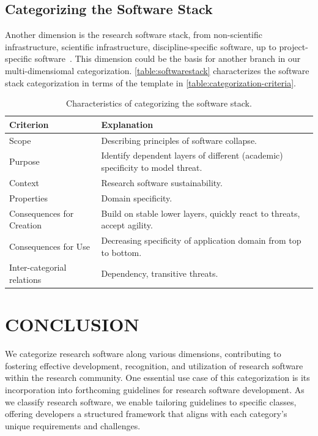 \documentclass{IEEEcsmag}
\begin{document}
\subsection{Categorizing the Software Stack}

Another dimension is the research software stack, from non-scientific infrastructure, scientific infrastructure, discipline-specific software, up to project-specific software~\cite{Hinsen2019}.
This dimension could be the basis for another branch in our multi-dimensiomal categorization.
\autoref{table:softwarestack} characterizes the software stack categorization in terms of the template in \autoref{table:categorization-criteria}.

\begin{table}[bt]
    \centering
    \begin{tabularx}{\textwidth}{l X}
    \toprule
        Criterion & Explanation \\
    \midrule
        Scope & Describing principles of software collapse. \\
        Purpose & Identify dependent layers of different (academic) specificity to model threat.\\
        Context & Research software sustainability. \\
        Properties & Domain specificity. \\
        Consequences for Creation & Build on stable lower layers, quickly react to threats, accept agility.\\
        Consequences for Use & Decreasing specificity of application domain from top to bottom.\\
        Inter-categorial relations & Dependency, transitive threats.\\
    \bottomrule
    \end{tabularx}
    \caption{Characteristics of categorizing the software stack.}
    \label{table:softwarestack}
\end{table}

\section{CONCLUSION}

We categorize research software along various dimensions, contributing to fostering effective development, recognition, and utilization of research software within the research community. One essential use case of this categorization is its incorporation into forthcoming guidelines for research software development. As we classify research software, we enable tailoring guidelines to specific classes, offering developers a structured framework that aligns with each category's unique requirements and challenges.
\end{document}
